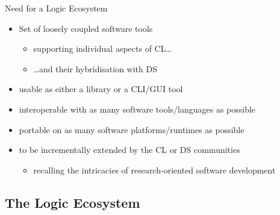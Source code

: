 \documentclass[presentation]{beamer}\mode<presentation>{\usetheme{AMSBolognaFC}}
\begin{document}
\begin{frame}{Need for a Logic Ecosystem}
    \begin{itemize}
        \item Set of loosely coupled \alert{software} tools
        \begin{itemize}
            \item supporting individual aspects of CL\ldots
            \item \ldots and their hybridisation with DS
        \end{itemize}

        \vfill

        \item usable as either a \alert{library} or a CLI/GUI tool
        
        \vfill

        \item \alert{interoperable} with as many software \alert{tools/languages} as possible
        
        \vfill

        \item \alert{portable} on as many software \alert{platforms/runtimes} as possible
        
        \vfill

        \item to be \alert{incrementally extended} by the CL or DS communities
        \begin{itemize}
            \item recalling the intricacies of \alert{research-oriented} software development
        \end{itemize}
    \end{itemize}
\end{frame}

\subsection{The \twopkt{} Logic Ecosystem}
\end{document}
